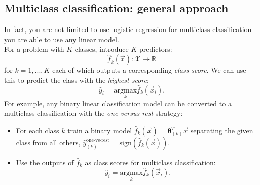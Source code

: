 \newpage
\subsection{Multiclass classification: general approach}
In fact, you are not limited to use logistic regression for multiclass classification - you are able to use any linear model.\\

For a problem with $K$ classes, introduce $K$ predictors:
\begin{equation*}
\hat{f}_k(\vec{x}) : \mathcal{X} \rightarrow \mathbb{R}
\end{equation*}
for $k = 1,..., K$ each of which outputs a corresponding \textit{class score}. We can use this to predict the class with the \textit{highest score}:
\begin{equation*}
\hat{y}_i = \underset{k}{\textrm{argmax}} \hat{f}_k(\vec{x}_i).
\end{equation*}
For example, any binary linear classification model can be converted to a multiclass classification with the \textit{one-versus-rest} strategy:
\begin{itemize}
\item For each class $k$ train a binary model $\hat{f}_k(\vec{x}) = \pmb{\theta}^T_{(k)}\vec{x}$ separating the given class from all others, $\hat{y}^{\text{one-vs-rest}}_{(k)} = \textrm{sign}(\hat{f}_k(\vec{x}))$. 
\item Use the outputs of $\hat{f}_k$ as class scores for multiclass classification:
\begin{equation*}
\hat{y}_i = \underset{k}{\textrm{argmax}} \hat{f}_k(\vec{x}_i).
\end{equation*}
\end{itemize}

